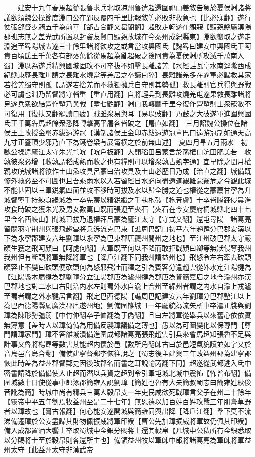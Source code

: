　　建安十九年春馬超從張魯求兵北取凉州魯遣超還圍祁山姜敘告急於夏侯淵諸將議欲須魏公操節度淵曰公在鄴反覆四千里比報敘等必敗非救急也【比必寐翻】遂行使張郃督步騎五千為前軍【郃古合翻又曷閤翻】超敗走韓遂在顯親【顯親縣屬漢陽郡班志無之盖光武所置以封竇友賢曰顯親故城在今秦州成紀縣東】淵欲襲取之遂走淵追至畧陽城去遂三十餘里諸將欲攻之或言當攻興國氐【魏畧曰建安中興國氐王阿貴百頃氐王千萬各有部落萬餘從馬超為亂超破之後阿貴為夏侯淵所攻滅千萬南入蜀】淵以為遂兵精興國城固攻不可卒抜不如擊長離諸羌【水經註瓦亭水南逕隴西成紀縣東歷長離川謂之長離水燒當等羌居之卒讀曰猝】長離諸羌多在遂軍必歸救其家若捨羌獨守則孤【謂遂若捨羌而不救獨擁兵自守則其勢孤】救長離則官兵得與野戰必可虜也淵乃留督將守輜重【重直用翻】自將輕兵到長離攻燒羌屯遂果救長離諸將見遂兵衆欲結營作塹乃與戰【塹七艷翻】淵曰我轉鬭千里今復作營塹則士衆罷敝不可復用【復扶又翻罷讀曰疲】賊雖衆易與耳【易以䜴翻】乃鼔之大破遂軍進圍興國氐王千萬犇馬超餘衆悉降轉擊高平屠各皆破之【屠直如翻】　三月詔魏公操位在諸侯王上改授金璽赤紱遠游冠【漢制諸侯王金印赤紱遠遊冠董巴曰遠游冠制如通天高九寸正豎頂少邪乃直下為鐵卷梁有展筩横之於前無山述】　夏四月旱五月雨水　初魏公操遣廬江太守朱光屯皖【皖戶板翻】大開稻田呂蒙言於孫權曰皖田肥美若一收孰彼衆必增【收孰謂稻成熟而收之也有糧則可以增衆孰古熟字通】宜早除之閏月權親攻皖城諸將欲作土山添攻具呂蒙曰治攻具及土山必歷日乃成【治直之翻】城備既修外救必至不可圖也且吾乘雨水以入若留經日水必向盡還道艱難蒙竊危之今觀此城不能甚固以三軍鋭氣四面並攻不移時可拔及水以歸全勝之道也權從之蒙薦甘寧為升城督寧手持練身緣城為士卒先蒙以精鋭繼之手執枹鼓【枹音膚】士卒皆騰踊侵晨進攻食時破之獲朱光及男女數萬口既而張遼至夾石【夾石在今安慶府桐城縣北四十七里今名西峽山】聞城已拔乃退權拜呂蒙為廬江太守【守式又翻】還屯尋陽　諸葛亮留關羽守荆州與張飛趙雲將兵泝流克巴東【譙周巴記曰初平六年趙韙分巴郡安漢以下為永寧郡建安六年劉璋以永寧為巴東郡唐夔州開州之地也】至江州破巴郡太守嚴顔生獲之飛呵顔曰【呵虎何翻】大軍既至何以不降而敢拒戰顔曰卿等無狀侵奪我州我州但有斷頭將軍無降將軍也【降戶江翻下同我州謂益州也】飛怒令左右牽去砍頭顔容止不變曰砍頭便砍頭何為怒邪飛壯而釋之引為賓客分遣趙雲從外水定江陽犍為【江陽縣本屬犍為郡劉璋分立江陽郡唐為瀘州犍為郡唐為資簡嘉眉之地今渝州亦漢巴郡地也對二水口右則涪内水左則蜀外水自渝上合州至綿州者謂之内水自渝上戎瀘至蜀者謂之外水犍居言翻】飛定巴西德陽【譙周巴記建安六年劉璋分巴郡墊江以上為巴西德陽縣屬廣漢郡唐遂州地】劉備圍雒城且一年龎統為流矢所中卒灋正牋與劉璋為陳形勢彊弱【中竹仲翻卒子恤翻為于偽翻】且曰左將軍從舉兵以來舊心依依實無薄意【盖時人以璋倚備為用備反襲璋議備之薄也】愚以為可圖變化以保尊門【尊門謂璋家門】璋不答雒城潰備進圍成都諸葛亮張飛趙雲引兵來會馬超知張魯不足與計事又魯將楊昂等數害其能超内懷於邑【數所角翻師古曰於邑短氣貌讀並如字又於音烏邑音烏合翻】備使建寧督郵李恢往說之【蜀志後主建興三年改益州郡為建寧郡恢此時盖為益州郡督郵史因後改郡名而書之耳說輸芮翻下同】超遂從武都逃入氐中密書請降於備備使人止超而潛以兵資之超到令引軍屯城北城中震怖【怖普布翻】備圍城數十日使從事中郎涿郡簡雍入說劉璋【簡姓也魯有大夫簡叔蜀志曰簡雍姓耿後音訛為簡】時城中尚有精兵三萬人糓帛支一年吏民咸欲死戰璋言父子在州二十餘年【靈帝中平五年劉焉牧益州至是二十七年】無恩德以加百姓百姓攻戰三年肌膏草野者以璋故也【膏古報翻】何心能安遂開城與簡雍同輿出降【降戶江翻】羣下莫不流涕備遷璋於公安盡歸其財物佩振威將軍印綬【曹公先加璋振威將軍故仍佩其印綬】備入成都置酒大饗士卒取蜀城中金銀分賜將士還其糓帛【凡城中公私所有金銀悉取以分賜將士至於穀帛則各還所主也】備領益州牧以軍師中郎將諸葛亮為軍師將軍益州太守【此益州太守非漢武帝